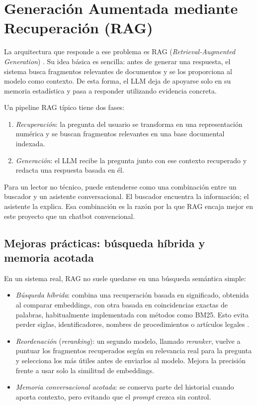 \section{Generación Aumentada mediante Recuperación (RAG)}

La arquitectura que responde a ese problema es RAG (\textit{Retrieval-Augmented Generation}) \cite{lewis2020rag}. Su idea básica es sencilla: antes de generar una respuesta, el sistema busca fragmentos relevantes de documentos y se los proporciona al modelo como contexto. De esta forma, el LLM deja de apoyarse solo en su memoria estadística y pasa a responder utilizando evidencia concreta.

Un pipeline RAG típico tiene dos fases:

\begin{enumerate}
    \item \textit{Recuperación}: la pregunta del usuario se transforma en una representación numérica y se buscan fragmentos relevantes en una base documental indexada.
    \item \textit{Generación}: el LLM recibe la pregunta junto con ese contexto recuperado y redacta una respuesta basada en él.
\end{enumerate}

Para un lector no técnico, puede entenderse como una combinación entre un buscador y un asistente conversacional. El buscador encuentra la información; el asistente la explica. Esa combinación es la razón por la que RAG encaja mejor en este proyecto que un chatbot convencional.

\subsection{Mejoras prácticas: búsqueda híbrida y memoria acotada}

En un sistema real, RAG no suele quedarse en una búsqueda semántica simple:

\begin{itemize}
    \item \textit{Búsqueda híbrida}: combina una recuperación basada en significado, obtenida al comparar embeddings, con otra basada en coincidencias exactas de palabras, habitualmente implementada con métodos como BM25. Esto evita perder siglas, identificadores, nombres de procedimientos o artículos legales \cite{robertson2009bm25,weaviateHybridDocs,qdrantHybridTutorial}.
    \item \textit{Reordenación} (\textit{reranking}): un segundo modelo, llamado \textit{reranker}, vuelve a puntuar los fragmentos recuperados según su relevancia real para la pregunta y selecciona los más útiles antes de enviarlos al modelo. Mejora la precisión frente a usar solo la similitud de embeddings.
    \item \textit{Memoria conversacional acotada}: se conserva parte del historial cuando aporta contexto, pero evitando que el \textit{prompt} crezca sin control.
\end{itemize}

